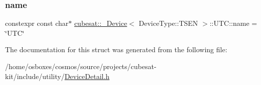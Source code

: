 \subsubsection{\texorpdfstring{name}{name}}
{\footnotesize\ttfamily constexpr const char$\ast$ \hyperlink{structcubesat_1_1__Device}{cubesat\+::\+\_\+\+Device}$<$ Device\+Type\+::\+T\+S\+EN $>$\+::U\+T\+C\+::name = \char`\"{}U\+TC\char`\"{}\hspace{0.3cm}{\ttfamily [static]}}



The documentation for this struct was generated from the following file\+:\begin{DoxyCompactItemize}
\item 
/home/osboxes/cosmos/source/projects/cubesat-\/kit/include/utility/\hyperlink{DeviceDetail_8h}{Device\+Detail.\+h}\end{DoxyCompactItemize}
